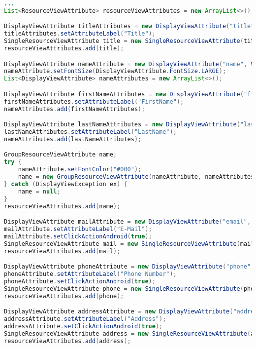 \begin{lstlisting}[label=lst:cardview_impl,
language=java,
firstnumber=1,
caption=Erstellung einer \textit{CardView}.]			
...
List<ResourceViewAttribute> resourceViewAttributes = new ArrayList<>();

DisplayViewAttribute titleAttributes = new DisplayViewAttribute("title", ViewAttribute.AttributeType.TEXT);
titleAttributes.setAttributeLabel("Title");
SingleResourceViewAttribute title = new SingleResourceViewAttribute(titleAttributes);
resourceViewAttributes.add(title);

DisplayViewAttribute nameAttribute = new DisplayViewAttribute("name", ViewAttribute.AttributeType.TEXT);
nameAttribute.setFontSize(DisplayViewAttribute.FontSize.LARGE);
List<DisplayViewAttribute> nameAttributes = new ArrayList<>();

DisplayViewAttribute firstNameAttributes = new DisplayViewAttribute("firstName", ViewAttribute.AttributeType.TEXT);
firstNameAttributes.setAttributeLabel("FirstName");
nameAttributes.add(firstNameAttributes);

DisplayViewAttribute lastNameAttributes = new DisplayViewAttribute("lastName", ViewAttribute.AttributeType.TEXT);
lastNameAttributes.setAttributeLabel("LastName");
nameAttributes.add(lastNameAttributes);

GroupResourceViewAttribute name;
try {
	nameAttribute.setFontColor("#000");
	name = new GroupResourceViewAttribute(nameAttribute, nameAttributes);
} catch (DisplayViewException ex) {
	name = null;
}
resourceViewAttributes.add(name);

DisplayViewAttribute mailAttribute = new DisplayViewAttribute("email", ViewAttribute.AttributeType.MAIL);
mailAttribute.setAttributeLabel("E-Mail");
mailAttribute.setClickActionAndroid(true);
SingleResourceViewAttribute mail = new SingleResourceViewAttribute(mailAttribute);
resourceViewAttributes.add(mail);

DisplayViewAttribute phoneAttribute = new DisplayViewAttribute("phone", ViewAttribute.AttributeType.PHONE_NUMBER);
phoneAttribute.setAttributeLabel("Phone Number");
phoneAttribute.setClickActionAndroid(true);
SingleResourceViewAttribute phone = new SingleResourceViewAttribute(phoneAttribute);
resourceViewAttributes.add(phone);

DisplayViewAttribute addressAttribute = new DisplayViewAttribute("address", ViewAttribute.AttributeType.LOCATION);
addressAttribute.setAttributeLabel("Address");
addressAttribute.setClickActionAndroid(true);
SingleResourceViewAttribute address = new SingleResourceViewAttribute(addressAttribute);
resourceViewAttributes.add(address);


\end{lstlisting}
